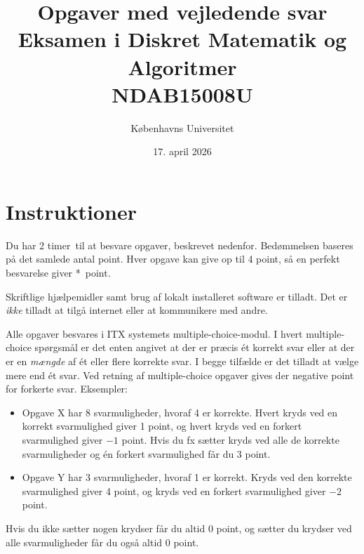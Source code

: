 \documentclass[12pt]{article}
\newcommand{\examdate}{17. april 2026}
\newcommand{\examduration}{2 timer}
\newcommand{\problemfile}{dma-problems-2026-april} %
\newcommand{\medsvar}{{\bf Opgaver med vejledende svar}\\}
\newcommand{\medsvar}{}
\begin{document}
\title{\Large \medsvar Eksamen i Diskret Matematik og Algoritmer\\
{\small NDAB15008U}}

\author{Københavns Universitet}
\date{\examdate}

\maketitle

\section*{Instruktioner}

Du har \examduration\ til at besvare  opgaver, beskrevet nedenfor.
Bedømmelsen baseres på det samlede antal point.
Hver opgave kan give op til 4 point, så en perfekt besvarelse giver \the{}*\relax\ point.

\medskip

Skriftlige hjælpemidler samt brug af lokalt installeret software er tilladt. Det er \emph{ikke} tilladt at tilgå internet eller at kommunikere med andre.

\medskip

Alle opgaver besvares i ITX systemets multiple-choice-modul.
I hvert multiple-choice spørgsmål er det enten angivet at der er præcis ét korrekt svar eller at der er en \emph{mængde} af ét eller flere korrekte svar.
I begge tilfælde er det tilladt at vælge mere end ét svar.
Ved retning af multiple-choice opgaver gives der negative point for forkerte svar.
Eksempler:
\begin{itemize}
\item Opgave X har 8 svarmuligheder, hvoraf 4 er korrekte. Hvert kryds ved en korrekt svarmulighed giver 1 point, og hvert kryds ved en forkert svarmulighed giver $-1$ point. Hvis du fx sætter kryds ved alle de korrekte svarmuligheder og én forkert svarmulighed får du 3 point.
\item Opgave Y har 3 svarmuligheder, hvoraf 1 er korrekt. Kryds ved den korrekte svarmulighed giver 4 point, og kryds ved en forkert svarmulighed giver $-2$ point.
\end{itemize}
Hvis du ikke sætter nogen krydser får du altid 0 point, og sætter du krydser ved alle svarmuligheder får du også altid 0 point.

\newpage


\end{document}
